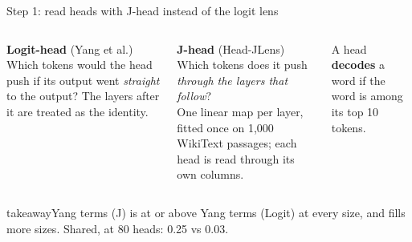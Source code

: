 \documentclass[aspectratio=169,11pt,xcolor=table]{beamer}
\newcommand{\takeaway}[1]{\vfill
  \begin{beamercolorbox}[wd=\textwidth,sep=6pt]{takeaway}#1\end{beamercolorbox}}
\newcommand{\gnote}[1]{{\footnotesize\color{gray}#1}}
\begin{document}
\begin{frame}{Step 1: read heads with J-head instead of the logit lens}
\begin{columns}[c]
\textbf{Logit-head} (Yang et al.)\\[2pt]
Which tokens would the head push if its output went \emph{straight} to the output?
The layers after it are treated as the identity.

\vspace{0.9em}
\textbf{J-head} (Head-JLens)\\[2pt]
Which tokens does it push \emph{through the layers that follow}?\\
\gnote{One linear map per layer, fitted once on 1{,}000 WikiText passages;
each head is read through its own columns.}

\vspace{0.9em}
A head \textbf{decodes} a word if the word is among its top 10 tokens.

\centering
{}
\end{columns}
\takeaway{Yang terms (J) is at or above Yang terms (Logit) at every size, and fills more sizes.
Shared, at 80 heads: 0.25 vs 0.03.}
\end{frame}
\end{document}
